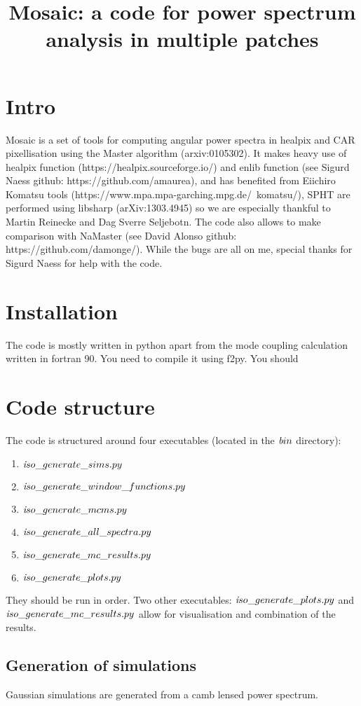 \documentclass[a4paper, 11pt]{article}
\begin{document}
\title{Mosaic: a code for power spectrum analysis in multiple patches}
\maketitle

\section{Intro}

Mosaic is a set of tools for computing angular power spectra in healpix and CAR pixellisation using the Master algorithm (arxiv:0105302).
It makes heavy use of healpix function (https://healpix.sourceforge.io/) and enlib function (see Sigurd Naess github: https://github.com/amaurea), and has benefited from Eiichiro Komatsu tools (https://www.mpa.mpa-garching.mpg.de/~komatsu/), SPHT are performed using libsharp (arXiv:1303.4945) so we are especially thankful to Martin Reinecke and Dag Sverre Seljebotn.
The code also allows to make comparison with NaMaster (see David Alonso github: https://github.com/damonge/).
While the bugs are all on me, special thanks for Sigurd Naess for help with the code.

\section{Installation}

The code is mostly written in python apart from the mode coupling calculation written in fortran 90. You need to compile it using f2py. 
You should  

\section{Code structure}

The code is structured around four executables (located in the ${\textit bin} $ directory): 
\begin{enumerate}
\item ${\textit  iso\_generate\_sims.py }$
\item ${\textit  iso\_generate\_window\_functions.py }$
\item ${\textit  iso\_generate\_mcms.py  }$
\item ${\textit  iso\_generate\_all\_spectra.py  }$
\item ${\textit  iso\_generate\_mc\_results.py  } $
\item ${\textit  iso\_generate\_plots.py  } $
\end{enumerate}

They should be run in order.  
Two other executables:  ${\textit  iso\_generate\_plots.py  }$ and ${\textit  iso\_generate\_mc\_results.py  }$ allow for visualisation and combination of the results.

\subsection{Generation of simulations}

Gaussian simulations are generated from a camb lensed power spectrum.
\end{document}
